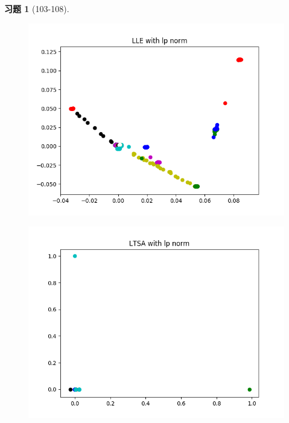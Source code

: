 \documentclass[a4paper, UTF8]{ctexart}
\newtheorem*{exercise}{\textbf{习题}}
\begin{document}
\begin{exercise}[103-108]
  	\clearpage
  	\begin{figure}[htbp!]
  		\centering
  		\includegraphics[width = \textwidth]{hw7_fig3.png}
  	\end{figure}
  	\clearpage
  	\begin{figure}[htbp!]
  		\centering
  		\includegraphics[width = \textwidth]{hw7_fig4.png}
  	\end{figure}
  	\clearpage
  	\begin{figure}[htbp!]
  		\centering

\end{figure}
\end{exercise}
\end{document}
